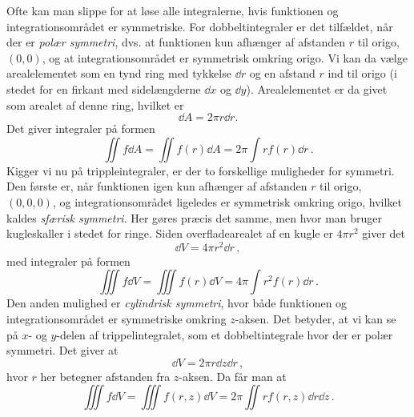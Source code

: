 Ofte kan man slippe for at løse alle integralerne, hvis funktionen og integrationsområdet er symmetriske.
For dobbeltintegraler er det tilfældet, når der er \emph{polær symmetri},
dvs. at funktionen kun afhænger af afstanden $r$ til origo, $(0,0)$, og at integrationsområdet er symmetrisk omkring origo. Vi kan da vælge arealelementet som en tynd ring med tykkelse $\dd r$ og en afstand $r$ ind til origo (i stedet for en firkant med sidelængderne $\dd{x}$ og $\dd{y}$). Arealelementet er da givet som arealet af denne ring, hvilket er
\begin{equation} \label{eq:ArealElementMat}
    \dd{A} = 2\pi r\dd{r}.
\end{equation}
Det giver integraler på formen
\begin{equation} \label{mat:eq:polardoubleint}
    \iint f\dd{A}=\iint f(r) \dd{A}=2\pi\int rf(r)\dd{r} \, .
\end{equation}
Kigger vi nu på trippleintegraler, er der to forskellige muligheder for symmetri.
Den første er, når funktionen igen kun afhænger af afstanden $r$ til origo, $(0,0,0)$, og integrationsområdet ligeledes er symmetrisk omkring origo, hvilket kaldes {\em sfærisk symmetri}.
Her gøres præcis det samme, men hvor man bruger kugleskaller i stedet for ringe. Siden overfladearealet af en kugle er $4\pi r^2$ giver det
\begin{equation}
    \dd{V} = 4\pi r^2 \dd{r} \, ,
\end{equation}
med integraler på formen
\begin{equation}
    \iiint f\dd{V} = \iiint f(r)\dd{V} = 4\pi\int r^2f(r)\dd{r} \, .
\end{equation}
Den anden mulighed er {\em cylindrisk symmetri}, hvor både funktionen og integrationsområdet er symmetriske omkring $z$-aksen. Det betyder, at vi kan se på $x$- og $y$-delen af trippelintegralet, som et dobbeltintegrale hvor der er polær symmetri.
Det giver at
\begin{equation}
    \dd{V} = 2\pi r \dd{z}\dd{r} \, ,
\end{equation}
hvor $r$ her betegner afstanden fra $z$-aksen. Da får man at
\begin{equation}
    \iiint f\dd{V} = \iiint f(r,z)\dd{V} = 2\pi\iint r f(r,z)\dd{r}\dd{z} \, .
\end{equation}